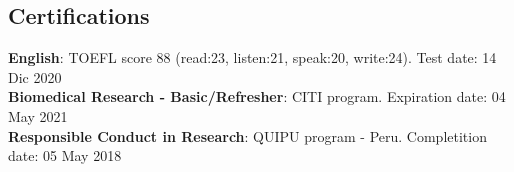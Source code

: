 \documentclass[margin,line]{res}
\begin{document}
\begin{resume}
\section{\sc Certifications}
{\bf English}: TOEFL score 88 (read:23, listen:21, speak:20, write:24). \hfill Test date: 14 Dic 2020\\
{\bf Biomedical Research - Basic/Refresher}: CITI program. \hfill Expiration date: 04 May 2021\\
{\bf Responsible Conduct in Research}: QUIPU program - Peru. \hfill Completition date: 05 May 2018%







\end{resume}
\end{document}

